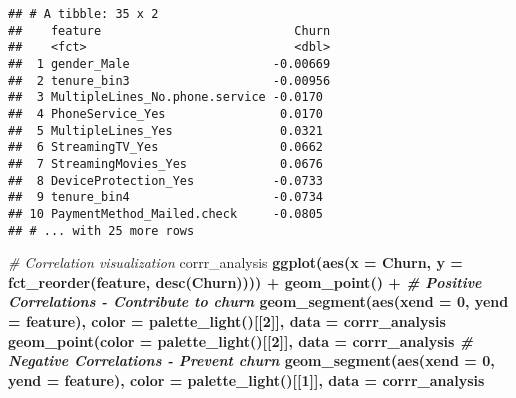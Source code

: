 \documentclass[]{article}
\newenvironment{Shaded}{\begin{snugshade}}{\end{snugshade}}
\newcommand{\KeywordTok}[1]{\textcolor[rgb]{0.13,0.29,0.53}{\textbf{#1}}}
\newcommand{\DataTypeTok}[1]{\textcolor[rgb]{0.13,0.29,0.53}{#1}}
\newcommand{\DecValTok}[1]{\textcolor[rgb]{0.00,0.00,0.81}{#1}}
\newcommand{\StringTok}[1]{\textcolor[rgb]{0.31,0.60,0.02}{#1}}
\newcommand{\CommentTok}[1]{\textcolor[rgb]{0.56,0.35,0.01}{\textit{#1}}}
\newcommand{\OperatorTok}[1]{\textcolor[rgb]{0.81,0.36,0.00}{\textbf{#1}}}
\newcommand{\NormalTok}[1]{#1}
\begin{document}
\begin{verbatim}
## # A tibble: 35 x 2
##    feature                           Churn
##    <fct>                             <dbl>
##  1 gender_Male                    -0.00669
##  2 tenure_bin3                    -0.00956
##  3 MultipleLines_No.phone.service -0.0170 
##  4 PhoneService_Yes                0.0170 
##  5 MultipleLines_Yes               0.0321 
##  6 StreamingTV_Yes                 0.0662 
##  7 StreamingMovies_Yes             0.0676 
##  8 DeviceProtection_Yes           -0.0733 
##  9 tenure_bin4                    -0.0734 
## 10 PaymentMethod_Mailed.check     -0.0805 
## # ... with 25 more rows
\end{verbatim}

\begin{Shaded}
\begin{Highlighting}[]
\CommentTok{# Correlation visualization}
\NormalTok{corrr_analysis }\OperatorTok{%>%}
\StringTok{  }\KeywordTok{ggplot}\NormalTok{(}\KeywordTok{aes}\NormalTok{(}\DataTypeTok{x =}\NormalTok{ Churn, }\DataTypeTok{y =} \KeywordTok{fct_reorder}\NormalTok{(feature, }\KeywordTok{desc}\NormalTok{(Churn)))) }\OperatorTok{+}
\StringTok{  }\KeywordTok{geom_point}\NormalTok{() }\OperatorTok{+}
\StringTok{  }\CommentTok{# Positive Correlations - Contribute to churn}
\StringTok{  }\KeywordTok{geom_segment}\NormalTok{(}\KeywordTok{aes}\NormalTok{(}\DataTypeTok{xend =} \DecValTok{0}\NormalTok{, }\DataTypeTok{yend =}\NormalTok{ feature), }
               \DataTypeTok{color =} \KeywordTok{palette_light}\NormalTok{()[[}\DecValTok{2}\NormalTok{]], }
               \DataTypeTok{data =}\NormalTok{ corrr_analysis }\OperatorTok{%>%}\StringTok{ }\KeywordTok{filter}\NormalTok{(Churn }\OperatorTok{>}\StringTok{ }\DecValTok{0}\NormalTok{)) }\OperatorTok{+}
\StringTok{  }\KeywordTok{geom_point}\NormalTok{(}\DataTypeTok{color =} \KeywordTok{palette_light}\NormalTok{()[[}\DecValTok{2}\NormalTok{]], }
             \DataTypeTok{data =}\NormalTok{ corrr_analysis }\OperatorTok{%>%}\StringTok{ }\KeywordTok{filter}\NormalTok{(Churn }\OperatorTok{>}\StringTok{ }\DecValTok{0}\NormalTok{)) }\OperatorTok{+}
\StringTok{  }\CommentTok{# Negative Correlations - Prevent churn}
\StringTok{  }\KeywordTok{geom_segment}\NormalTok{(}\KeywordTok{aes}\NormalTok{(}\DataTypeTok{xend =} \DecValTok{0}\NormalTok{, }\DataTypeTok{yend =}\NormalTok{ feature), }
               \DataTypeTok{color =} \KeywordTok{palette_light}\NormalTok{()[[}\DecValTok{1}\NormalTok{]], }
               \DataTypeTok{data =}\NormalTok{ corrr_analysis }\OperatorTok{%>%}\StringTok{ }\KeywordTok{filter}\NormalTok{(Churn }\OperatorTok{<}\StringTok{ }\DecValTok{0}\NormalTok{)) }\OperatorTok{+}
}}}}
\end{Highlighting}
\end{Shaded}
\end{document}
